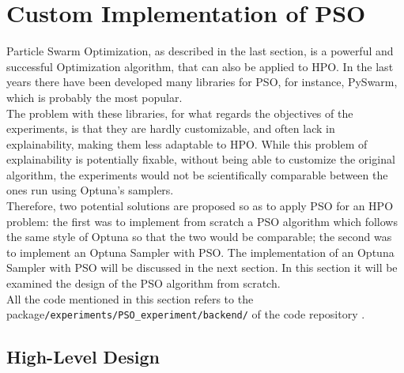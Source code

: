 \section{Custom Implementation of PSO}\label{sec:hyperlink-1}

Particle Swarm Optimization, as described in the last section, is a powerful and successful Optimization algorithm, that can also be applied to HPO.
In the last years there have been developed many libraries for PSO, for instance, PySwarm, which is probably the most popular.
\\[0.3cm]The problem with these libraries, for what regards the objectives of the experiments, is that they are hardly customizable, and often lack in explainability, making them less adaptable to HPO.
While this problem of explainability is potentially fixable, without being able to customize the original algorithm, the experiments would not be scientifically comparable between the ones run using Optuna's samplers.
\\[0.3cm]Therefore, two potential solutions are proposed so as to apply PSO for an HPO problem: the first was to implement from scratch a PSO algorithm which follows the same style of Optuna so that the two would be comparable; the second was to implement an Optuna Sampler with PSO.
The implementation of an Optuna Sampler with PSO will be discussed in the next section. In this section it will be examined the design of the PSO algorithm from scratch.
\\[0.3cm]All the code mentioned in this section refers to the package\newline\texttt{/experiments/PSO\_experiment/backend/} of the code repository \cite{Repository-THESIS}.

\subsection{High-Level Design}

